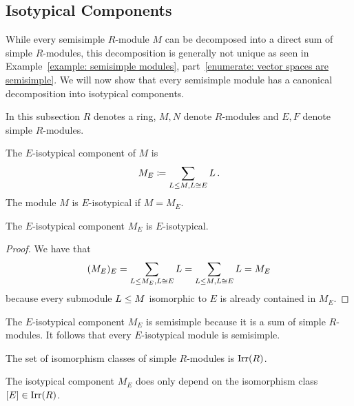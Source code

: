 \subsection{Isotypical Components}


\begin{fluff}
  While every semisimple $R$-module $M$ can be decomposed into a direct sum of simple $R$-modules, this decomposition is generally not unique as seen in Example~\ref{example: semisimple modules}, part~\ref*{enumerate: vector spaces are semisimple}.
  We will now show that every semisimple module has a canonical decomposition into isotypical components.
\end{fluff}


\begin{conventions}
  In this subsection $R$ denotes a ring, $M, N$ denote $R$-modules and $E, F$ denote simple $R$-modules.
\end{conventions}


\begin{definition}
  The $E$-isotypical component of $M$ is
  \[
              M_E
    \coloneqq  \sum_{L \leq M, L \cong E} L \,.
  \]
  The module $M$ is $E$-isotypical if $M = M_E$.
\end{definition}


\begin{lemma}
  The $E$-isotypical component $M_E$ is $E$-isotypical.
\end{lemma}


\begin{proof}
  We have that
  \[
      (M_E)_E
    = \sum_{L \leq M_E, L \cong E} L
    = \sum_{L \leq M, L \cong E} L
    = M_E
  \]
  because every submodule $L \leq M$ isomorphic to $E$ is already contained in $M_E$.
\end{proof}


\begin{remark}
  The $E$-isotypical component $M_E$ is semisimple because it is a sum of simple $R$-modules.
  It follows that every $E$-isotypical module is semisimple.
\end{remark}


\begin{definition}
  The set of isomorphism classes of simple $R$-modules is $\operatorname{Irr}(R)$.
\end{definition}


\begin{remark}
  The isotypical component $M_E$ does only depend on the isomorphism class $[E] \in \operatorname{Irr}(R)$.
\end{remark}


